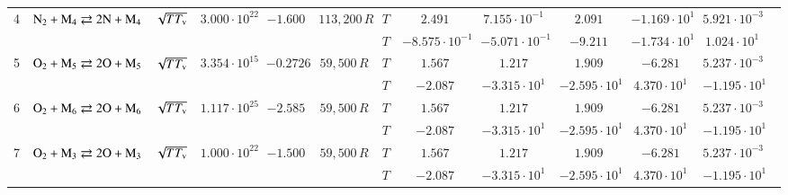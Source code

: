 \documentclass{warpdoc}
\begin{document}
\begin{table}[!ht]
\begin{center}
\begin{threeparttable}
\begin{tabular}{ccccccccccccc}
                                          
4 & $\rm N_2 + M_4 \rightleftarrows 2N+M_4$ &$\sqrt{T T_{\rm v}}$ & $3.000 \cdot 10^{22}$ & $-1.600$ & $113,200\, R$ 
                                          &$T$  & $2.491$  & $7.155 \cdot 10^{-1}$  & $2.091$ & $-1.169 \cdot 10^{1}$ & $5.921 \cdot 10^{-3}$ & \multirow{2}{*}{\cite{jtht:1993:park,jtht:2001:park,ijhmt:2021:kim}} \\
 & & & & &                                &$T$  & $-8.575 \cdot 10^{-1}$  & $-5.071 \cdot 10^{-1}$  & $-9.211$ & $-1.734 \cdot 10^{1}$ & $1.024 \cdot 10^{1}$ & ~ \\                                          
                                          
                                          
5 & $\rm O_2 + M_5 \rightleftarrows 2O+M_5$ &$\sqrt{T T_{\rm v}}$ & $3.354 \cdot 10^{15}$ & $-0.2726$ & $59,500\, R$ 
                                          &$T$  & $1.567$  & $1.217$  & $1.909$ & $-6.281$ & $5.237 \cdot 10^{-3}$ & \multirow{2}{*}{\cite{ijhmt:2020:kim,ijhmt:2021:kim}} \\
 & & & & &                                &$T$  & $-2.087$  & $-3.315 \cdot 10^{1}$  & $-2.595 \cdot 10^{1}$ & $4.370 \cdot 10^{1}$ & $-1.195 \cdot 10^{1}$ & ~ \\                                          
                                                                                   
6 & $\rm O_2 + M_6 \rightleftarrows 2O+M_6$ &$\sqrt{T T_{\rm v}}$ & $1.117 \cdot 10^{25}$ & $-2.585$ & $59,500\, R$ 
                                          &$T$  & $1.567$  & $1.217$  & $1.909$ & $-6.281$ & $5.237 \cdot 10^{-3}$ & \multirow{2}{*}{\cite{ijhmt:2020:kim,ijhmt:2021:kim}} \\
 & & & & &                                &$T$  & $-2.087$  & $-3.315 \cdot 10^{1}$  & $-2.595 \cdot 10^{1}$ & $4.370 \cdot 10^{1}$ & $-1.195 \cdot 10^{1}$ & ~ \\                                          
                                                                                    
7 & $\rm O_2 + M_3 \rightleftarrows 2O+M_3$ &$\sqrt{T T_{\rm v}}$ & $1.000 \cdot 10^{22}$ & $-1.500$ & $59,500\, R$ 
                                          &$T$  & $1.567$  & $1.217$  & $1.909$ & $-6.281$ & $5.237 \cdot 10^{-3}$ & \multirow{2}{*}{\cite{jtht:1993:park,jtht:2001:park,ijhmt:2021:kim}} \\
 & & & & &                                &$T$  & $-2.087$  & $-3.315 \cdot 10^{1}$  & $-2.595 \cdot 10^{1}$ & $4.370 \cdot 10^{1}$ & $-1.195 \cdot 10^{1}$ & ~ \\                                          
                                                                                   

\end{tabular}
\end{threeparttable}
\end{center}
\end{table}
\end{document}
